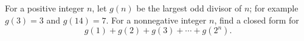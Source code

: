 For a positive integer $n$, let $g(n)$ be the largest odd divisor of $n$; for example $g(3)=3$ and $g(14)=7$. For a nonnegative integer $n$, find a closed form for
\[g(1)+g(2)+g(3)+\cdots+g\left(2^n\right).\]
